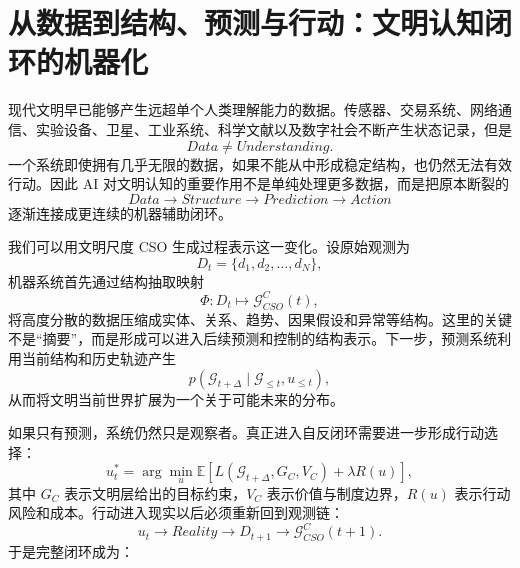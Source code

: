 \section{从数据到结构、预测与行动：文明认知闭环的机器化}

现代文明早已能够产生远超单个人类理解能力的数据。传感器、交易系统、网络通信、实验设备、卫星、工业系统、科学文献以及数字社会不断产生状态记录，但是
\begin{equation}
Data
\neq
Understanding.
\end{equation}
一个系统即使拥有几乎无限的数据，如果不能从中形成稳定结构，也仍然无法有效行动。因此 AI 对文明认知的重要作用不是单纯处理更多数据，而是把原本断裂的
\begin{equation}
Data
\rightarrow
Structure
\rightarrow
Prediction
\rightarrow
Action
\end{equation}
逐渐连接成更连续的机器辅助闭环。

我们可以用文明尺度 CSO 生成过程表示这一变化。设原始观测为
\begin{equation}
D_t
=
\{d_1,d_2,\ldots,d_N\},
\end{equation}
机器系统首先通过结构抽取映射
\begin{equation}
\Phi:
D_t
\mapsto
\mathcal{G}^{C}_{CSO}(t),
\end{equation}
将高度分散的数据压缩成实体、关系、趋势、因果假设和异常等结构。这里的关键不是“摘要”，而是形成可以进入后续预测和控制的结构表示。下一步，预测系统利用当前结构和历史轨迹产生
\begin{equation}
p
\left(
\mathcal{G}_{t+\Delta}
\mid
\mathcal{G}_{\leq t},
u_{\leq t}
\right),
\end{equation}
从而将文明当前世界扩展为一个关于可能未来的分布。

如果只有预测，系统仍然只是观察者。真正进入自反闭环需要进一步形成行动选择：
\begin{equation}
u_t^{*}
=
\arg\min_{u}
\mathbb{E}
\left[
L
\left(
\mathcal{G}_{t+\Delta},
G_C,
V_C
\right)
+
\lambda R(u)
\right],
\end{equation}
其中 $G_C$ 表示文明层给出的目标约束，$V_C$ 表示价值与制度边界，$R(u)$ 表示行动风险和成本。行动进入现实以后必须重新回到观测链：
\begin{equation}
u_t
\rightarrow
Reality
\rightarrow
D_{t+1}
\rightarrow
\mathcal{G}^{C}_{CSO}(t+1).
\end{equation}
于是完整闭环成为：
\begin{statementbox}
\centering
{}
\end{statementbox}

